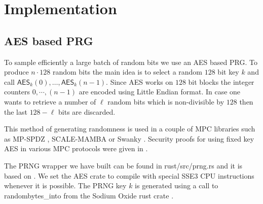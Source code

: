 \section{Implementation}

\subsection{AES based PRG}
\label{sec:aes}

To sample efficiently a large batch of random bits we use an AES based PRG.
To produce $n \cdot 128$ random bits the main idea is to select a random
$128$ bit key $k$ and call $\mathsf{AES}_k(0), \dots, \mathsf{AES}_k(n-1)$.
Since AES works on $128$ bit blocks the integer counters $0, \cdots, (n-1)$
are encoded using Little Endian format.  In case one wants to retrieve a
number of $\ell$ random bits which is non-divisible by $128$ then the last
$128 - \ell$ bits are discarded.

This method of generating
randomness is used in a couple of MPC libraries such as MP-SPDZ
\cite{CCS:Keller20}, SCALE-MAMBA \cite{SCALE} or Swanky \cite{url-swanky}.
Security proofs for using fixed key AES in various MPC protocols were given
in \cite{SP:GKWY20}.

The PRNG wrapper we have built can be found in \textsf{rust/src/prng.rs} and
it is based on \cite{url-cargo-aes}.  We set the \textsf{AES} crate to
compile with special SSE3 CPU instructions whenever it is possible.
The PRNG key $k$ is generated using a call to \textsf{randombytes\_into}
from the Sodium Oxide rust crate \cite{url-sodiumoxide}.


